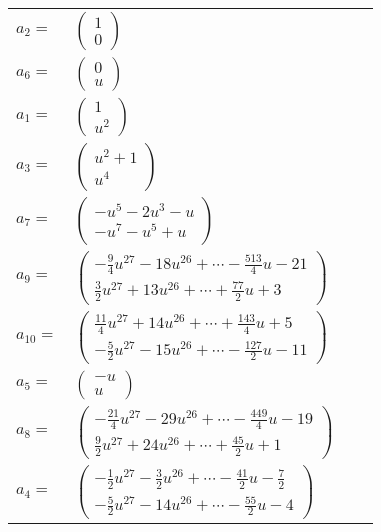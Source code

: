 \documentclass[1p]{elsarticle_modified}
\theoremstyle{definition}
\begin{document}
\begin{tabular}{m{7pt} m{180pt} m{7pt} m{180pt} }
\flushright $a_{2}=$&$\begin{pmatrix}1\\0\end{pmatrix}$ \\
\flushright $a_{6}=$&$\begin{pmatrix}0\\u\end{pmatrix}$ \\
\flushright $a_{1}=$&$\begin{pmatrix}1\\u^2\end{pmatrix}$ \\
\flushright $a_{3}=$&$\begin{pmatrix}u^2+1\\u^4\end{pmatrix}$ \\
\flushright $a_{7}=$&$\begin{pmatrix}- u^5-2 u^3- u\\- u^7- u^5+u\end{pmatrix}$ \\
\flushright $a_{9}=$&$\begin{pmatrix}-\frac{9}{4} u^{27}-18 u^{26}+\cdots-\frac{513}{4} u-21\\\frac{3}{2} u^{27}+13 u^{26}+\cdots+\frac{77}{2} u+3\end{pmatrix}$ \\
\flushright $a_{10}=$&$\begin{pmatrix}\frac{11}{4} u^{27}+14 u^{26}+\cdots+\frac{143}{4} u+5\\-\frac{5}{2} u^{27}-15 u^{26}+\cdots-\frac{127}{2} u-11\end{pmatrix}$ \\
\flushright $a_{5}=$&$\begin{pmatrix}- u\\u\end{pmatrix}$ \\
\flushright $a_{8}=$&$\begin{pmatrix}-\frac{21}{4} u^{27}-29 u^{26}+\cdots-\frac{449}{4} u-19\\\frac{9}{2} u^{27}+24 u^{26}+\cdots+\frac{45}{2} u+1\end{pmatrix}$ \\
\flushright $a_{4}=$&$\begin{pmatrix}-\frac{1}{2} u^{27}-\frac{3}{2} u^{26}+\cdots-\frac{41}{2} u-\frac{7}{2}\\-\frac{5}{2} u^{27}-14 u^{26}+\cdots-\frac{55}{2} u-4\end{pmatrix}$ \\

\end{tabular}
\end{document}
